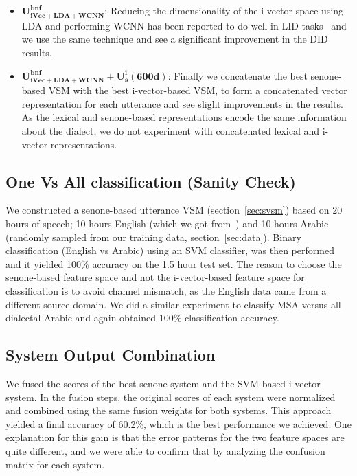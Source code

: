 \documentclass{article}
\begin{document}
\begin{itemize}
  \item $\mathbf{U_{iVec+LDA+WCNN}^{bnf}}$: Reducing the dimensionality of the i-vector space using LDA and performing WCNN has been reported to do well in LID tasks~\cite{dehak2011language} and we use the same technique and see a significant improvement in the DID results.
  \item $\mathbf{U_{iVec+LDA+WCNN}^{bnf} + U_{s}^{i}(600d)}$: Finally we concatenate the best senone-based VSM with the best i-vector-based VSM, to form a concatenated vector representation for each utterance and see slight improvements in the results. As the lexical and senone-based representations encode the same information about the dialect, we do not experiment with concatenated lexical and i-vector representations.
\end{itemize}






\subsection{One Vs All classification (Sanity Check)}
We  constructed a senone-based utterance VSM (section~\ref{sec:svsm}) based on 20 hours of speech; 10 hours English (which we got from~\cite{glass2004analysis}) and 10 hours Arabic (randomly sampled from our training data, section~\ref{sec:data}). Binary classification (English vs Arabic) using an SVM classifier, was then performed and it yielded 100\% accuracy on the 1.5 hour test set. The reason to choose the senone-based feature space and not the i-vector-based feature space for classification is to avoid channel mismatch, as the English data came from a different source domain. We did a similar experiment to classify MSA versus all dialectal Arabic and again obtained 100\% classification accuracy.

\subsection{System Output Combination}
We fused the scores of the best senone system and the SVM-based i-vector system. In the fusion steps, the original scores of each system were normalized and combined using the same fusion weights for both systems. This approach yielded a final accuracy of 60.2\%, which is the best performance we achieved. One explanation for this gain is that the error patterns for the two feature spaces are quite different, and we were able to confirm that by analyzing the confusion matrix for each system.
\end{document}
